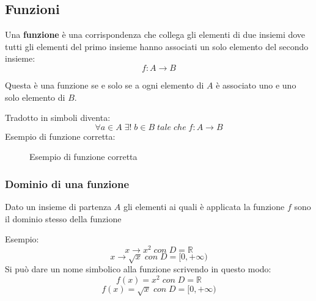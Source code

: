 \documentclass[a4paper]{article}
\theoremstyle{break}
\theoremstyle{break}
\theoremstyle{break}
\theoremstyle{break}
\begin{document}
\subsection{Funzioni}
\begin{definition}
	Una \textbf{funzione} è una corrispondenza che collega gli elementi di due insiemi dove tutti
	gli elementi del primo insieme hanno associati un solo elemento del secondo insieme:
	\[
		f: A \to B
	\]
\end{definition}
Questa è una funzione se e solo se a ogni elemento di \( A \) è associato uno e uno solo elemento di \( B \).

Tradotto in simboli diventa:
\[
	\forall a \in A \;\exists !\; b \in B \;tale\;che\; f: A \to B
\]
Esempio di funzione corretta:
\begin{figure}[H]
	\begin{center}
	\end{center}
	\caption{Esempio di funzione corretta}
\end{figure}

\subsubsection{Dominio di una funzione}
\begin{definition}
	Dato un insieme di partenza \( A \) gli elementi ai quali è applicata la funzione \( f \) sono
	il dominio stesso della funzione
\end{definition}
Esempio:
\[
	x \to x^2\; con\; D=\mathbb{R}
\] \[
	x \to \sqrt{x}\; con\; D=[0,+\infty)
\]
Si può dare un nome simbolico alla funzione scrivendo in questo modo:
\[
	f(x)=x^2\; con\; D=\mathbb{R}
\] \[
	f(x)=\sqrt{x}\; con\; D=[0,+\infty)
\]
\end{document}
